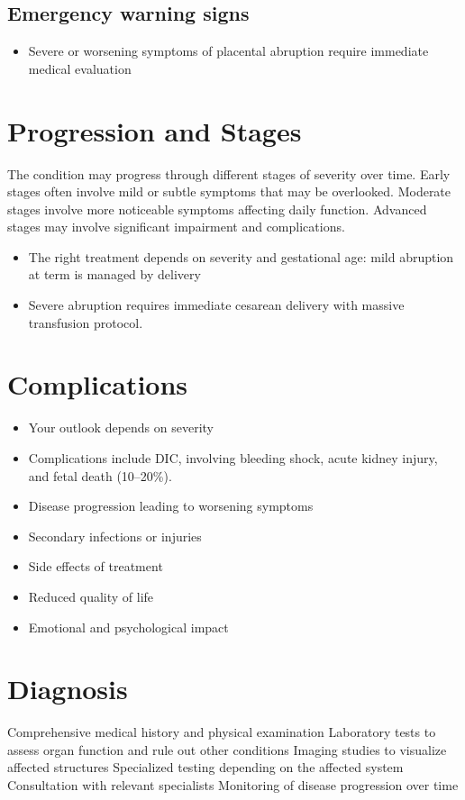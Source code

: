 \subsection{Emergency warning signs}
\begin{itemize}[noitemsep]
  \item Severe or worsening symptoms of placental abruption require immediate medical evaluation
\end{itemize}
\section{Progression and Stages}
The condition may progress through different stages of severity over time. Early stages often involve mild or subtle symptoms that may be overlooked. Moderate stages involve more noticeable symptoms affecting daily function. Advanced stages may involve significant impairment and complications.

\begin{itemize}[noitemsep]
  \item The right treatment depends on severity and gestational age: mild abruption at term is managed by delivery
  \item Severe abruption requires immediate cesarean delivery with massive transfusion protocol.
\end{itemize}
\section{Complications}
\begin{itemize}[noitemsep]
  \item Your outlook depends on severity
  \item Complications include DIC, involving bleeding shock, acute kidney injury, and fetal death (10--20\%).
  \item Disease progression leading to worsening symptoms
  \item Secondary infections or injuries
  \item Side effects of treatment
  \item Reduced quality of life
  \item Emotional and psychological impact
\end{itemize}
\section{Diagnosis}
Comprehensive medical history and physical examination Laboratory tests to assess organ function and rule out other conditions Imaging studies to visualize affected structures Specialized testing depending on the affected system Consultation with relevant specialists Monitoring of disease progression over time

